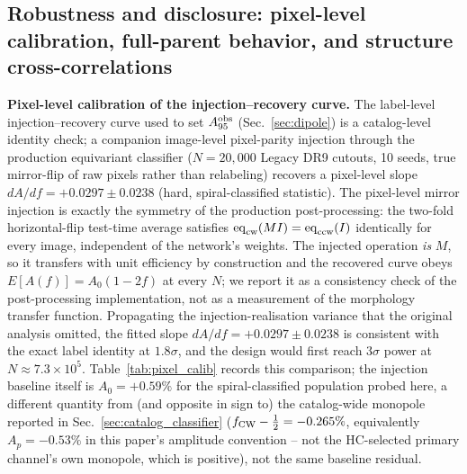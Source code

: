 \documentclass[twocolumn,linenumbers]{aastex702}
\begin{document}
\subsection{Robustness and disclosure: pixel-level calibration, full-parent behavior, and structure cross-correlations}
\label{sec:robustness_disclosure}

\textbf{Pixel-level calibration of the injection--recovery curve.} The
label-level injection--recovery curve used to set $A_{95}^{\rm obs}$
(Sec.~\ref{sec:dipole}) is a catalog-level identity check; a companion
image-level pixel-parity injection through the production equivariant
classifier ($N=20{,}000$ Legacy DR9 cutouts, 10 seeds, true mirror-flip of
raw pixels rather than relabeling) recovers a pixel-level slope
$dA/df=+0.0297\pm0.0238$ (hard, spiral-classified statistic). The
pixel-level mirror injection is exactly the symmetry of the production
post-processing: the two-fold horizontal-flip test-time average satisfies
$\mathrm{eq}_{\rm cw}(MI) = \mathrm{eq}_{\rm ccw}(I)$ identically for every
image, independent of the network's weights. The injected operation
\emph{is} $M$, so it transfers with unit efficiency by construction and
the recovered curve obeys $E[A(f)] = A_0(1-2f)$ at every $N$; we report it
as a consistency check of the post-processing implementation, not as a
measurement of the morphology transfer function. Propagating the
injection-realisation variance that the original analysis omitted, the
fitted slope $dA/df = +0.0297 \pm 0.0238$ is consistent with the exact
label identity at $1.8\sigma$, and the design would first reach $3\sigma$
power at $N \approx 7.3\times10^5$. Table~\ref{tab:pixel_calib} records
this comparison; the injection baseline itself is $A_0=+0.59\%$ for
the spiral-classified population probed here, a different quantity from
(and opposite in sign to) the catalog-wide monopole reported in
Sec.~\ref{sec:catalog_classifier} ($f_{\rm CW}-\tfrac12=-0.265\%$,
equivalently $A_p=-0.53\%$ in this paper's amplitude convention -- not the
HC-selected primary channel's own monopole, which is positive), not the
same baseline residual.
\end{document}

